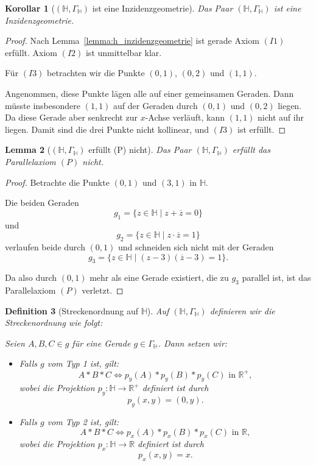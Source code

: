 \documentclass[a4paper,12pt]{article}
\theoremstyle{break}
\newtheorem{definition}{Definition}[section]
\newtheorem{lemma}[definition]{Lemma}
\newtheorem{corollary}[definition]{Korollar}
\begin{document}
\begin{corollary}[$(\mathbb{H}, \Gamma_\mathbb{H})$ ist eine Inzidenzgeometrie]
Das Paar $(\mathbb{H}, \Gamma_\mathbb{H})$ ist eine Inzidenzgeometrie.
\end{corollary}

\begin{proof}
Nach Lemma~\ref{lemma:h_inzidenzgeometrie} ist gerade Axiom \((I1)\) erfüllt. Axiom \((I2)\) ist unmittelbar klar.

Für \((I3)\) betrachten wir die Punkte \( (0,1) \), \( (0,2) \) und \( (1,1) \). 

Angenommen, diese Punkte lägen alle auf einer gemeinsamen Geraden. Dann müsste insbesondere \( (1,1) \) auf der Geraden durch \( (0,1) \) und \( (0,2) \) liegen. Da diese Gerade aber senkrecht zur \(x\)-Achse verläuft, kann \( (1,1) \) nicht auf ihr liegen. Damit sind die drei Punkte nicht kollinear, und \((I3)\) ist erfüllt.
\end{proof}

\begin{lemma}[$(\mathbb{H}, \Gamma_{\mathbb{H}})$ erfüllt (P) nicht]
Das Paar $(\mathbb{H}, \Gamma_{\mathbb{H}})$ erfüllt das Parallelaxiom \((P)\) nicht.
\end{lemma}

\begin{proof}
Betrachte die Punkte \( (0,1) \) und \( (3,1) \) in \( \mathbb{H} \). 

Die beiden Geraden 
\[
g_1 = \{ z \in \mathbb{H} \mid z + \overline{z} = 0 \}
\]
und
\[
g_2 = \{ z \in \mathbb{H} \mid z \cdot \overline{z} = 1 \}
\]
verlaufen beide durch \( (0,1) \) und schneiden sich nicht mit der Geraden 
\[
g_3 = \{ z \in \mathbb{H} \mid (z - 3)(\overline{z} - 3) = 1 \}.
\]

Da also durch \( (0,1) \) mehr als eine Gerade existiert, die zu \( g_3 \) parallel ist, ist das Parallelaxiom \((P)\) verletzt.
\end{proof}

\begin{definition}[Streckenordnung auf $\mathbb{H}$]\label{def:streckenordnung_h}
Auf $(\mathbb{H}, \Gamma_{\mathbb{H}})$ definieren wir die Streckenordnung wie folgt:

Seien \( A, B, C \in g \) für eine Gerade \( g \in \Gamma_{\mathbb{H}} \). Dann setzen wir:

\begin{itemize}
    \item Falls \( g \) vom Typ 1 ist, gilt:
    \[
    A * B * C \iff p_y(A) * p_y(B) * p_y(C) \text{ in } \mathbb{R}^+,
    \]
    wobei die Projektion \( p_y: \mathbb{H} \to \mathbb{R}^+ \) definiert ist durch
    \[
    p_y(x,y) = (0,y).
    \]
    
    \item Falls \( g \) vom Typ 2 ist, gilt:
    \[
    A * B * C \iff p_x(A) * p_x(B) * p_x(C) \text{ in } \mathbb{R},
    \]
    wobei die Projektion \( p_x: \mathbb{H} \to \mathbb{R} \) definiert ist durch
    \[
    p_x(x,y) = x.
    \]
\end{itemize}
\end{definition}
\end{document}
